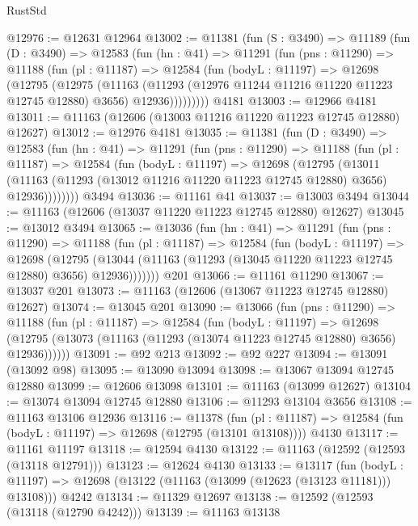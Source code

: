 \begin{lexlean}{RustStd}
\begin{coremodule}
@12976 := @12631 @12964
@13002 := @11381
    (fun (S : @3490) =>
    @11189
      (fun (D : @3490) =>
      @12583
        (fun (hn : @41) =>
        @11291
          (fun (pns : @11290) =>
          @11188
            (fun (pl : @11187) =>
            @12584
              (fun (bodyL : @11197) =>
              @12698
                (@12795
                  (@12975
                    (@11163
                      (@11293 (@12976 @11244 @11216 @11220 @11223 @12745 @12880) @3656)
                      @12936)))))))))
    @4181
@13003 := @12966 @4181
@13011 := @11163 (@12606 (@13003 @11216 @11220 @11223 @12745 @12880) @12627)
@13012 := @12976 @4181
@13035 := @11381
    (fun (D : @3490) =>
    @12583
      (fun (hn : @41) =>
      @11291
        (fun (pns : @11290) =>
        @11188
          (fun (pl : @11187) =>
          @12584
            (fun (bodyL : @11197) =>
            @12698
              (@12795
                (@13011
                  (@11163 (@11293 (@13012 @11216 @11220 @11223 @12745 @12880) @3656) @12936))))))))
    @3494
@13036 := @11161 @41
@13037 := @13003 @3494
@13044 := @11163 (@12606 (@13037 @11220 @11223 @12745 @12880) @12627)
@13045 := @13012 @3494
@13065 := @13036
    (fun (hn : @41) =>
    @11291
      (fun (pns : @11290) =>
      @11188
        (fun (pl : @11187) =>
        @12584
          (fun (bodyL : @11197) =>
          @12698
            (@12795
              (@13044 (@11163 (@11293 (@13045 @11220 @11223 @12745 @12880) @3656) @12936)))))))
    @201
@13066 := @11161 @11290
@13067 := @13037 @201
@13073 := @11163 (@12606 (@13067 @11223 @12745 @12880) @12627)
@13074 := @13045 @201
@13090 := @13066
    (fun (pns : @11290) =>
    @11188
      (fun (pl : @11187) =>
      @12584
        (fun (bodyL : @11197) =>
        @12698 (@12795 (@13073 (@11163 (@11293 (@13074 @11223 @12745 @12880) @3656) @12936))))))
@13091 := @92 @213
@13092 := @92 @227
@13094 := @13091 (@13092 @98)
@13095 := @13090 @13094
@13098 := @13067 @13094 @12745 @12880
@13099 := @12606 @13098
@13101 := @11163 (@13099 @12627)
@13104 := @13074 @13094 @12745 @12880
@13106 := @11293 @13104 @3656
@13108 := @11163 @13106 @12936
@13116 := @11378
    (fun (pl : @11187) => @12584 (fun (bodyL : @11197) => @12698 (@12795 (@13101 @13108))))
    @4130
@13117 := @11161 @11197
@13118 := @12594 @4130
@13122 := @11163 (@12592 (@12593 (@13118 @12791)))
@13123 := @12624 @4130
@13133 := @13117
    (fun (bodyL : @11197) => @12698 (@13122 (@11163 (@13099 (@12623 (@13123 @11181))) @13108)))
    @4242
@13134 := @11329 @12697
@13138 := @12592 (@12593 (@13118 (@12790 @4242)))
@13139 := @11163 @13138

\end{coremodule}
\end{lexlean}
